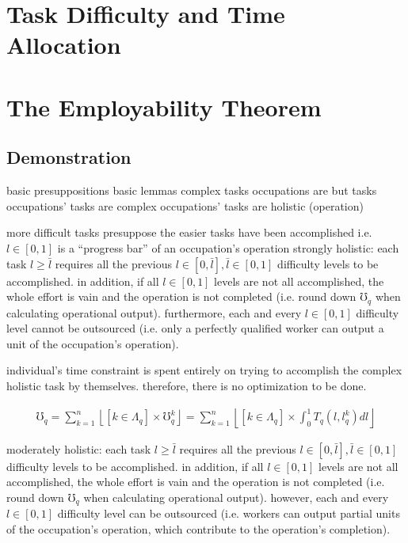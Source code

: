 \documentclass[hidelinks, nonatbib]{elsarticle}
\begin{document}
\section{Task Difficulty and Time Allocation}
\begin{definition}
    \label{ta}
\end{definition} 



\section{The Employability Theorem}
\subsection{Demonstration}
basic presuppositions
basic lemmas
complex tasks
occupations are but tasks
occupations' tasks are complex
occupations' tasks are holistic (operation)

more difficult tasks presuppose the easier tasks have been accomplished
i.e. $l \in [0,1]$ is a ``progress bar'' of an occupation's operation
strongly holistic: each task $l \geq \bar{l}$ requires all the previous $l \in [0, \bar{l}], \bar{l} \in [0,1]$ difficulty levels to be accomplished. in addition, if all $l \in [0,1]$ levels are not all accomplished, the whole effort is vain and the operation is not completed (i.e. round down $\mho_q$ when calculating operational output). furthermore, each and every $l \in [0,1]$ difficulty level cannot be outsourced (i.e. only a perfectly qualified worker can output a unit of the occupation's operation).

individual's time constraint is spent entirely on trying to accomplish the complex holistic task by themselves. therefore, there is no optimization to be done.

\begin{align*}
    \mho_q 
    = 
    \sum_{k=1}^{n}{
        \left\lfloor
            [k \in \Lambda_q]
            \times
            \mho_{q}^{k}
        \right\rfloor
    }
    = 
    \sum_{k=1}^{n}{
        \left\lfloor
            [k \in \Lambda_q]
            \times
            \int_{0}^{1}{
                T_{q}(l,l_{q}^{k})
                dl
            }
        \right\rfloor
    }
\end{align*}

moderately holistic: each task $l \geq \bar{l}$ requires all the previous $l \in [0, \bar{l}], \bar{l} \in [0,1]$ difficulty levels to be accomplished. in addition, if all $l \in [0,1]$ levels are not all accomplished, the whole effort is vain and the operation is not completed (i.e. round down $\mho_q$ when calculating operational output). however, each and every $l \in [0,1]$ difficulty level can be outsourced (i.e. workers can output partial units of the occupation's operation, which contribute to the operation's completion).
    
\end{document}
